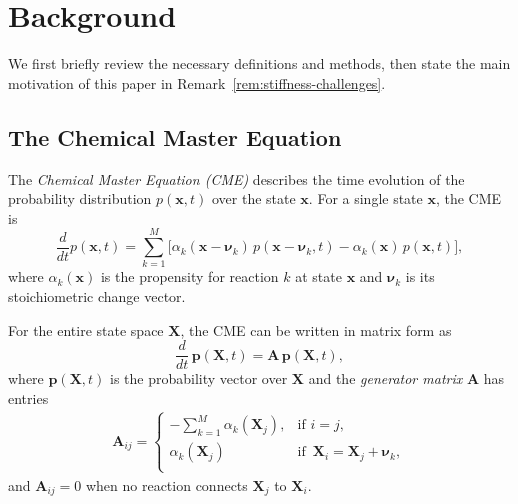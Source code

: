 \documentclass[onefignum,onetabnum]{siamart171218}
\begin{document}
\section{Background}
\label{sec:background}

We first briefly review the necessary definitions and methods, then state the main motivation of this paper in Remark~\ref{rem:stiffness-challenges}. 

\subsection{The Chemical Master Equation}

\begin{definition}
The \textit{Chemical Master Equation (CME)} describes the time evolution of the probability distribution $p(\boldsymbol{x}, t)$ over the state $\boldsymbol{x}$. For a single state $\boldsymbol{x}$, the CME is
\begin{equation}
    \frac{d}{dt} p(\boldsymbol{x}, t) =
    \sum_{k=1}^{M} \big[\alpha_k(\boldsymbol{x} - \boldsymbol{\nu}_k)\, p(\boldsymbol{x} - \boldsymbol{\nu}_k, t)
    - \alpha_k(\boldsymbol{x})\, p(\boldsymbol{x}, t)\big],
\end{equation}
where $\alpha_k(\boldsymbol{x})$ is the propensity for reaction $k$ at state $\boldsymbol{x}$ and $\boldsymbol{\nu}_k$ is its stoichiometric change vector.

For the entire state space $\mathbf{X}$, the CME can be written in matrix form as
\begin{equation}
    \frac{d}{dt}\, \boldsymbol{p}(\mathbf{X}, t) = \mathbf{A}\, \boldsymbol{p}(\mathbf{X}, t),
\end{equation}
where $\boldsymbol{p}(\mathbf{X}, t)$ is the probability vector over $\mathbf{X}$ and the \textit{generator matrix} $\mathbf{A}$ has entries
\begin{align}
    \mathbf{A}_{ij} =
    \begin{cases}
        -\displaystyle\sum_{k=1}^{M} \alpha_k(\mathbf{X}_j), & \text{if } i=j, \\
         \alpha_k(\mathbf{X}_j) & \text{if }\, \mathbf{X}_i=\mathbf{X}_j+\boldsymbol{\nu}_k, \\
    \end{cases}
\end{align}
and $\mathbf{A}_{ij}=0$ when no reaction connects $\mathbf{X}_j$ to $\mathbf{X}_i$.
\end{definition}
\end{document}
